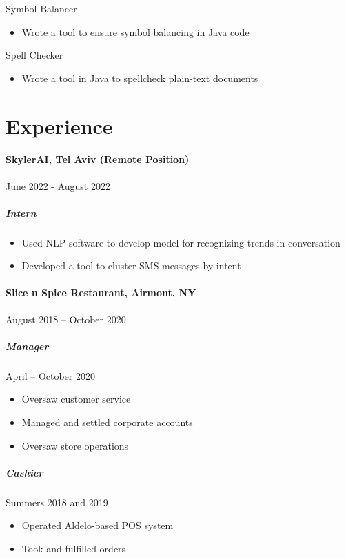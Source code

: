 \documentclass[10pt]{article}
\begin{document}
Symbol Balancer
\begin{itemize}
    \item Wrote a tool to ensure symbol balancing in Java code
\end{itemize}

Spell Checker
\begin{itemize}
    \item Wrote a tool in Java to spellcheck plain-text documents
\end{itemize}


\vfill
\section*{Experience}

\paragraph{SkylerAI, Tel Aviv (Remote Position)} \hfill June 2022 - August 2022
\subparagraph*{Intern}
\begin{itemize}
    \item Used NLP software to develop model for recognizing trends in conversation
    \item Developed a tool to cluster SMS messages by intent
\end{itemize}

\paragraph*{Slice n Spice Restaurant, Airmont, NY} \hfill August 2018 – October 2020
\subparagraph*{Manager} \hfill April – October 2020
\begin{itemize}
    \item Oversaw customer service
    \item Managed and settled corporate accounts
    \item Oversaw store operations
\end{itemize}
\subparagraph*{Cashier} \hfill Summers 2018 and 2019
\begin{itemize}
    \item Operated Aldelo-based POS system
    \item Took and fulfilled orders
\end{itemize}
\end{document}
